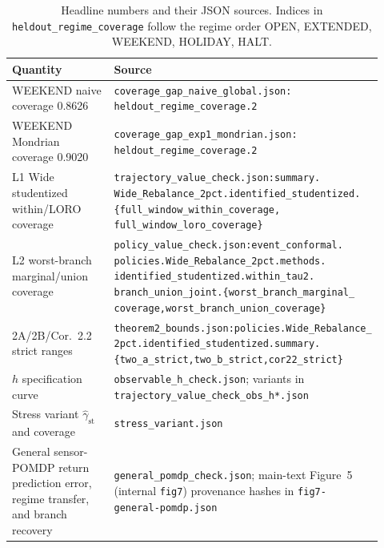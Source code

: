 \renewcommand{\thetable}{B\arabic{table}}
\renewcommand{\theHtable}{B\arabic{table}}
\setcounter{table}{10}
\begin{table}[!ht]
\centering
\small
\caption{Headline numbers and their JSON sources. Indices in
\texttt{heldout\_regime\_coverage} follow the regime order
OPEN, EXTENDED, WEEKEND, HOLIDAY, HALT.}
\label{tab:c1}
\begin{tabular}{@{}>{\raggedright\arraybackslash}p{0.36\linewidth}>{\raggedright\arraybackslash}p{0.56\linewidth}@{}}
\toprule
Quantity & Source \\
\midrule
WEEKEND naive coverage 0.8626 &
\texttt{coverage\_gap\_naive\_global.json:}\newline
\texttt{heldout\_regime\_coverage.2} \\
WEEKEND Mondrian coverage 0.9020 &
\texttt{coverage\_gap\_exp1\_mondrian.json:}\newline
\texttt{heldout\_regime\_coverage.2} \\
L1 Wide studentized within/LORO coverage &
\texttt{trajectory\_value\_check.json:summary.}\newline
\texttt{Wide\_Rebalance\_2pct.identified\_studentized.}\newline
\texttt{\{full\_window\_within\_coverage,}\newline
\texttt{full\_window\_loro\_coverage\}} \\
L2 worst-branch marginal/union coverage &
\texttt{policy\_value\_check.json:event\_conformal.}\newline
\texttt{policies.Wide\_Rebalance\_2pct.methods.}\newline
\texttt{identified\_studentized.within\_tau2.}\newline
\texttt{branch\_union\_joint.\{worst\_branch\_marginal\_}\newline
\texttt{coverage,worst\_branch\_union\_coverage\}} \\
2A/2B/Cor.~2.2 strict ranges &
\texttt{theorem2\_bounds.json:policies.Wide\_Rebalance\_}\newline
\texttt{2pct.identified\_studentized.summary.}\newline
\texttt{\{two\_a\_strict,two\_b\_strict,cor22\_strict\}} \\
$h$ specification curve &
\texttt{observable\_h\_check.json}; variants in\newline
\texttt{trajectory\_value\_check\_obs\_h*.json} \\
Stress variant $\hat\gamma_{\mathrm{st}}$ and coverage &
\texttt{stress\_variant.json} \\
General sensor-POMDP return prediction error, regime transfer, and branch recovery &
\texttt{general\_pomdp\_check.json}; main-text Figure~5 (internal
\texttt{fig7}) provenance hashes in \texttt{fig7-general-pomdp.json} \\
\bottomrule
\end{tabular}
\end{table}

